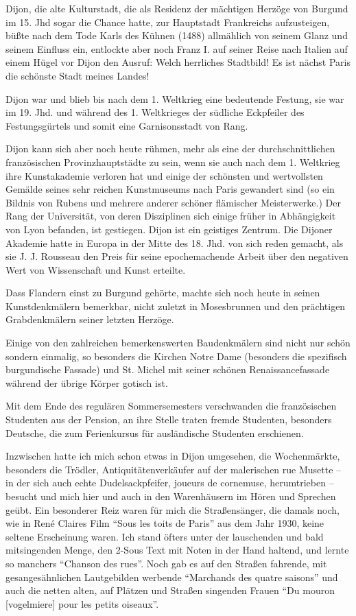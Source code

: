 \documentclass[a5paper,pagesize,10pt,twoside=true]{scrbook}
\begin{document}
Dijon, die alte Kulturstadt, die als Residenz der mächtigen Herzöge von Burgund im 15. Jhd sogar die Chance hatte, zur Hauptstadt Frankreichs aufzusteigen, büßte nach dem Tode Karls des Kühnen (1488) allmählich von seinem Glanz und seinem Einfluss ein, entlockte aber noch Franz I. auf seiner Reise nach Italien auf einem Hügel vor Dijon den Ausruf: Welch herrliches Stadtbild! Es ist nächst Paris die schönste Stadt meines Landes!

Dijon war und blieb bis nach dem 1. Weltkrieg eine bedeutende Festung, sie war im 19. Jhd. und während des 1. Weltkrieges der südliche Eckpfeiler des Festungsgürtels und somit eine Garnisonsstadt von Rang.

Dijon kann sich aber noch heute rühmen, mehr als eine der durchschnittlichen französischen Provinzhauptstädte zu sein, wenn sie auch nach dem 1. Weltkrieg ihre Kunstakademie verloren hat und einige der schönsten und wertvollsten Gemälde seines sehr reichen Kunstmuseums nach Paris gewandert sind (so ein Bildnis von Rubens und mehrere anderer schöner flämischer Meisterwerke.) Der Rang der Universität, von deren Disziplinen sich einige früher in Abhängigkeit von Lyon befanden, ist gestiegen. Dijon ist ein geistiges Zentrum. Die Dijoner Akademie hatte in Europa in der Mitte des 18. Jhd. von sich reden gemacht, als sie J. J. Rousseau den Preis für seine epochemachende Arbeit über den negativen Wert von Wissenschaft und Kunst erteilte.

Dass Flandern einst zu Burgund gehörte, machte sich noch heute in seinen Kunstdenkmälern bemerkbar, nicht zuletzt in Mosesbrunnen und den prächtigen Grabdenkmälern seiner letzten Herzöge.

Einige von den zahlreichen bemerkenswerten Baudenkmälern sind nicht nur schön sondern einmalig, so besonders die Kirchen Notre Dame (besonders die spezifisch burgundische Fassade) und St. Michel mit seiner schönen Renaissancefassade während der übrige Körper gotisch ist.

Mit dem Ende des regulären Sommersemesters verschwanden die französischen Studenten aus der Pension, an ihre Stelle traten fremde Studenten, besonders Deutsche, die zum Ferienkursus für ausländische Studenten erschienen.

Inzwischen hatte ich mich schon etwas in Dijon umgesehen, die Wochenmärkte, besonders die Trödler, Antiquitätenverkäufer auf der malerischen rue Musette -- in der sich auch echte Dudelsackpfeifer, joueurs de cornemuse, herumtrieben -- besucht und mich hier und auch in den Warenhäusern im Hören und Sprechen geübt. Ein besonderer Reiz waren für mich die Straßensänger, die damals noch, wie in René Claires Film \enquote{Sous les toits de Paris} aus dem Jahr 1930, keine seltene Erscheinung waren. Ich stand öfters unter der lauschenden und bald mitsingenden Menge, den 2-Sous Text mit Noten in der Hand haltend, und lernte so manchers \enquote{Chanson des rues}. Noch gab es auf den Straßen fahrende, mit gesangesähnlichen Lautgebilden werbende \enquote{Marchands des quatre saisons} und auch die netten alten, auf Plätzen und Straßen singenden Frauen \enquote{Du mouron [vogelmiere] pour les petits oiseaux}.
\end{document}
